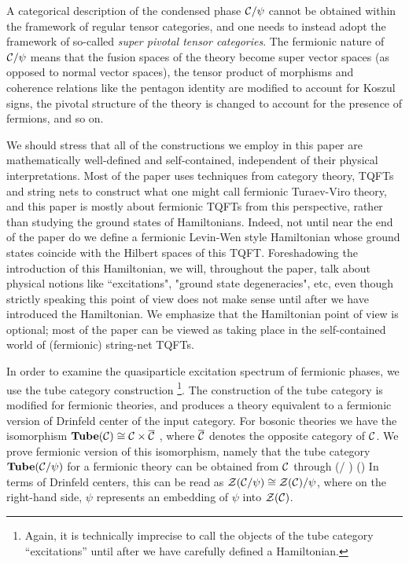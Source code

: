 A categorical description of the condensed phase $\mathcal{C} / \psi$ cannot be obtained within the framework 
of regular tensor categories, and one needs to instead adopt the framework of so-called {\it super pivotal tensor categories}. 
The fermionic nature of $\mathcal{C} / \psi$ means that the fusion spaces of the theory become super vector spaces 
(as opposed to normal vector spaces),  
the tensor product of morphisms and coherence relations like the pentagon identity are modified to account for Koszul signs, 
the pivotal structure of the theory is changed to account for the presence of fermions, and so on.

We should stress that all of the constructions we employ in this paper are mathematically well-defined and 
self-contained, independent of their physical interpretations. 
Most of the paper uses techniques from category theory, TQFTs and string nets to construct what one
might call fermionic Turaev-Viro theory, and this paper is mostly about fermionic TQFTs from this perspective, 
rather than studying the ground states of Hamiltonians. 
Indeed, not until near the end of the paper do we define a fermionic Levin-Wen style Hamiltonian whose ground states coincide with 
the Hilbert spaces of this TQFT.
Foreshadowing the introduction of this Hamiltonian, we will, throughout the paper, talk about physical notions like ``excitations", "ground state degeneracies", 
etc, even though
strictly speaking this point of view does not make sense until after we have introduced the Hamiltonian.
We emphasize that the Hamiltonian point of view is optional; most of the paper can be viewed as taking place
in the self-contained world of (fermionic) string-net TQFTs.

In order to examine the quasiparticle excitation spectrum of fermionic phases, 
we use the tube category construction \cite{ocneanu1994}\footnote{Again, it is technically imprecise to call the objects 
of the tube category ``excitations'' until after we have carefully defined a Hamiltonian.}.
The construction of the tube category is modified for fermionic theories, and produces a theory
equivalent to a fermionic version of Drinfeld center of the input category.
For bosonic theories we have the isomorphism $\textbf{Tube}(\mathcal{C})\cong\mathcal{C}\times\overline{\mathcal{C}}$ \cite{muger2003b}, where $\overline{\mathcal{C}}$ denotes the opposite category of $\mathcal{C}$. 
We prove fermionic version of this isomorphism, namely 
that the tube category $\textbf{Tube}(\mathcal{C}/\psi)$ for a fermionic theory can be obtained from $\mathcal{C}$ through
\be 
	\tube(\mcc / \psi) \cong \mcc \times (\overline{\mcc / \psi})
\ee
In terms of Drinfeld centers, this can be read as $\mathcal{Z}(\mathcal{C} / \psi)\cong \mathcal{Z}(\mathcal{C})/\psi$, where on the right-hand side, 
$\psi$ represents an embedding of $\psi$ into $\mathcal{Z}(\mathcal{C})$.


